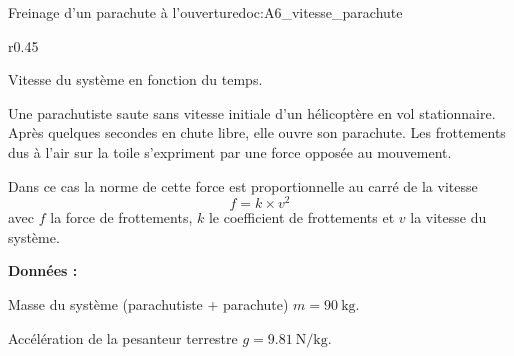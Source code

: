 

\newpage
{}

\begin{doc}{Freinage d'un parachute à l'ouverture}{doc:A6_vitesse_parachute}
  \begin{wrapfigure}{r}{0.45\linewidth}
    \vspace*{-24pt}
    \begin{center}
      \small{
        Vitesse du système en fonction du temps.
      }
    \end{center}
  \end{wrapfigure}
  
  Une parachutiste saute sans vitesse initiale d'un hélicoptère en vol stationnaire.
  Après quelques secondes en chute libre, elle ouvre son parachute.
  Les frottements dus à l'air sur la toile s'expriment par une force opposée au mouvement. 
  
  Dans ce cas la norme de cette force est proportionnelle au carré de la vitesse
  \begin{equation*}
    f = k \times v^2
  \end{equation*}
  avec $f$ la force de frottements, $k$ le coefficient de frottements et $v$ la vitesse du système.

  \textbf{Données :}
  \begin{listePoints}
    \item Masse du système (parachutiste + parachute) $m = \qty{90}{\kg}$.
    \item Accélération de la pesanteur terrestre $g = \qty{9,81}{\newton \per\kg}$.
  \end{listePoints}
\end{doc}







